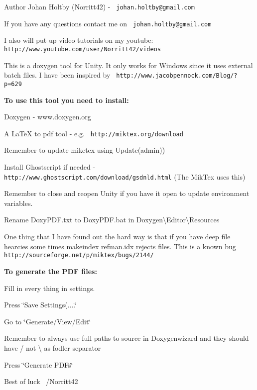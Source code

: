 \begin{DoxyAuthor}{Author}
Johan Holtby (Norritt42) -\/ {\texttt{ johan.\+holtby@gmail.\+com}}
\end{DoxyAuthor}
If you have any questions contact me on {\texttt{ johan.\+holtby@gmail.\+com}}

I also will put up video tutorials on my youtube\+: {\texttt{ http\+://www.\+youtube.\+com/user/\+Norritt42/videos}}

This is a doxygen tool for Unity. It only works for Windows since it uses external batch files. I have been inspired by {\texttt{ http\+://www.\+jacobpennock.\+com/\+Blog/?p=629}}

{\bfseries{To use this tool you need to install\+:}} 
\begin{DoxyEnumerate}
\item Doxygen -\/ www.\+doxygen.\+org 
\item A La\+TeX to pdf tool -\/ e.\+g. {\texttt{ http\+://miktex.\+org/download}}  
\item Remember to update miketex using Update(admin))  
\item Install Ghostscript if needed -\/ {\texttt{ http\+://www.\+ghostscript.\+com/download/gsdnld.\+html}} (The Mik\+Tex uses this) 
\item Remember to close and reopen Unity if you have it open to update environment variables. 
\item Rename Doxy\+PDF.\+txt to Doxy\+PDF.\+bat in Doxygen\textbackslash{}\+Editor\textbackslash{}\+Resources 
\end{DoxyEnumerate}

One thing that I have found out the hard way is that if you have deep file hearcies some times makeindex refman.\+idx rejects files. This is a known bug {\texttt{ http\+://sourceforge.\+net/p/miktex/bugs/2144/}}

{\bfseries{To generate the PDF files\+:}} 
\begin{DoxyEnumerate}
\item Fill in every thing in settings. 
\item Press \char`\"{}\+Save Settings(....\char`\"{} 
\item Go to \char`\"{}\+Generate/\+View/\+Edit\char`\"{} 
\item Remember to always use full paths to source in Doxygenwizard and they should have / not \textbackslash{} as fodler separator 
\item Press \char`\"{}\+Generate PDFs\char`\"{} 
\end{DoxyEnumerate}

Best of luck~\newline
/\+Norritt42 